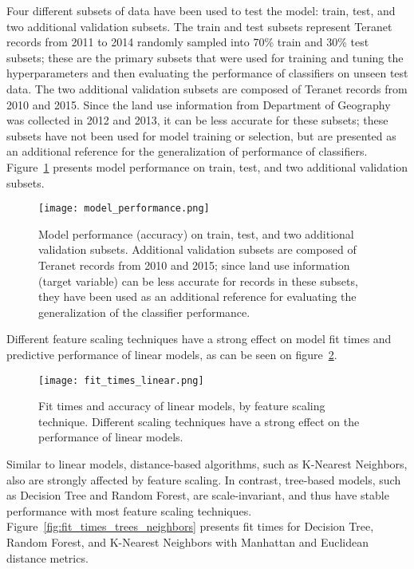 Four different subsets of data have been used to test the model: train, test, and two additional validation subsets.
The train and test subsets represent Teranet records from 2011 to 2014 randomly sampled into 70\% train and 30\% test subsets;
these are the primary subsets that were used for training and tuning the hyperparameters and then evaluating the performance of classifiers on unseen test data.
The two additional validation subsets are composed of Teranet records from 2010 and 2015.
Since the land use information from Department of Geography was collected in 2012 and 2013, it can be less accurate for these subsets;
these subsets have not been used for model training or selection, but are presented as an additional reference for the generalization of performance of classifiers.
Figure~\ref{fig:model_performance} presents model performance on train, test, and two additional validation subsets.

\begin{figure}[hbt!]
    \centering
    \texttt{[image: model\_performance.png]}
    \caption{Model performance (accuracy) on train, test, and two additional validation subsets.
    Additional validation subsets are composed of Teranet records from 2010 and 2015;
    since land use information (target variable) can be less accurate for records in these subsets, they have been used as an additional reference for evaluating the generalization of the classifier performance.}
    \label{fig:model_performance}
\end{figure}

Different feature scaling techniques have a strong effect on model fit times and predictive performance of linear models, as can be seen on figure~\ref{fig:fit_times_linear}.

\begin{figure}[hbt!]
    \centering
    \texttt{[image: fit\_times\_linear.png]}
    \caption{Fit times and accuracy of linear models, by feature scaling technique.
    Different scaling techniques have a strong effect on the performance of linear models.}
    \label{fig:fit_times_linear}
\end{figure}

Similar to linear models, distance-based algorithms, such as K-Nearest Neighbors, also are strongly affected by feature scaling.
In contrast, tree-based models, such as Decision Tree and Random Forest, are scale-invariant, and thus have stable performance with most feature scaling techniques.
Figure~\ref{fig:fit_times_trees_neighbors} presents fit times for Decision Tree, Random Forest, and K-Nearest Neighbors with Manhattan and Euclidean distance metrics.


